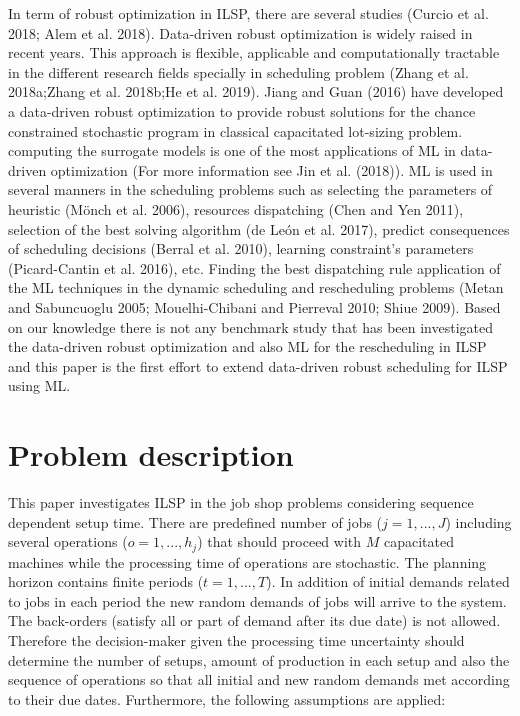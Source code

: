 \documentclass[letterpaper]{article} %
\begin{document}
In term of robust optimization in ILSP, there are  several studies (Curcio et al. 2018; Alem et al. 2018). Data-driven robust optimization is widely raised in recent years. This approach is flexible, applicable and computationally tractable in the different research fields specially in scheduling problem (Zhang et al. 2018a;Zhang et al. 2018b;He et al. 2019). Jiang and Guan (2016) have developed a data-driven robust optimization to provide robust solutions for the chance constrained stochastic program in classical capacitated lot-sizing problem.
computing the surrogate models is one of the most applications of ML in data-driven optimization (For more information see Jin et al. (2018)). ML is used in several manners in the scheduling problems such as selecting the parameters of heuristic (Mönch et al. 2006), resources dispatching (Chen and Yen 2011), selection of the best solving algorithm (de León et al. 2017), predict consequences of scheduling decisions (Berral et al. 2010), learning constraint's parameters (Picard-Cantin et al. 2016), etc. Finding the best dispatching rule application of the ML techniques in the dynamic scheduling and rescheduling problems (Metan and Sabuncuoglu 2005; Mouelhi-Chibani and Pierreval 2010; Shiue 2009). Based on our knowledge there is not any benchmark study that has been investigated the data-driven robust optimization and also ML for the rescheduling in ILSP and this paper is the first effort to extend data-driven robust scheduling for ILSP using ML.

\section{Problem description}
This paper investigates ILSP in the job shop problems considering sequence dependent setup time. There are predefined number of jobs ($j=1,...,J$) including several operations ($o=1,...,h_{j}$) that should proceed with $M$ capacitated machines while the processing time of operations are stochastic. The planning horizon contains finite periods ($t=1,...,T$). In addition of initial demands related to jobs in each period the new random demands of jobs will arrive to the system. The back-orders (satisfy all or part of demand after its due date) is not allowed. Therefore the decision-maker given the processing time uncertainty should determine the number of setups, amount of production in each setup and also the sequence of operations so that all initial and new random demands met according to their due dates. Furthermore, the following assumptions are applied:
\end{document}
